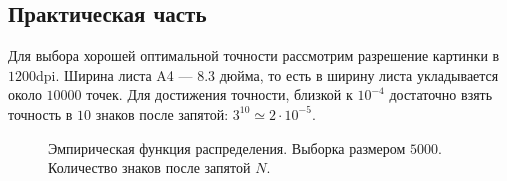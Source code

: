 \documentclass[12pt, a4paper]{article}
\begin{document}
\subsection{Практическая часть}\label{optimal_point_number}
Для выбора хорошей оптимальной точности рассмотрим разрешение картинки в $1200$dpi. Ширина листа A4 --- $8.3$ дюйма, то есть в ширину листа укладывается около $10000$ точек. Для достижения точности, близкой к $10^{-4}$ достаточно взять точность в $10$ знаков после запятой: $3^{10} \simeq 2\cdot10^{-5}$. 
\begin{figure}[H]
\caption{Эмпирическая функция распределения. Выборка размером $5000$. Количество знаков после запятой $N$.}
\end{figure}
\end{document}
